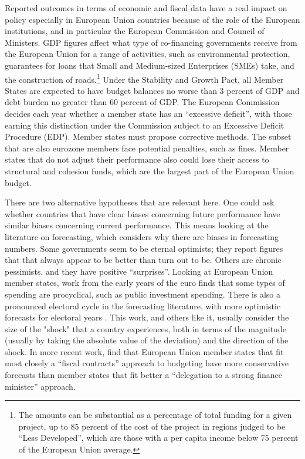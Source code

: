 \documentclass[]{article}
\begin{document}
Reported outcomes in terms of economic and fiscal data have a real impact on policy especially in European Union countries because of the role of the European institutions, and in particular the European Commission and Council of Ministers. GDP figures affect what type of co-financing governments receive from the European Union for a range of activities, such as environmental protection, guarantees for loans that Small and Medium-sized Enterprises (SMEs) take, and the construction of roads.\footnote{The amounts can be substantial as a percentage of total funding for a given project, up to 85 percent of the cost of the project in regions judged to be “Less Developed”, which are those with a per capita income below 75 percent of the European Union average.} Under the Stability and Growth Pact, all Member States are expected to have budget balances no worse than 3 percent of GDP and debt burden no greater than 60 percent of GDP. The European Commission decides each year whether a member state has an ``excessive deficit'', with those earning this distinction under the Commission subject to an Excessive Deficit Procedure (EDP). Member states must propose corrective methods. The subset that are also eurozone members face potential penalties, such as fines. Member states that do not adjust their performance also could lose their access to structural and cohesion funds, which are the largest part of the European Union budget.

There are two alternative hypotheses that are relevant here. One could ask whether countries that have clear biases concerning future performance have similar biases concerning current performance. This means looking at the literature on forecasting, which  considers why there are biases in forecasting numbers. Some governments seem to be eternal optimists; they report figures that that always appear to be better than turn out to be. Others are chronic pessimists, and they have positive ``surprises''. Looking at European Union member states, work from the early years of the euro finds that some types of spending are procyclical, such as public investment spending. There is also a pronounced electoral cycle in the forecasting literature, with more optimistic forecasts for electoral years \citep{hallerbergstrauch2002}. This work, and others like it, usually consider the size of the "shock" that a country experiences, both in terms of the magnitude (usually by taking the absolute value of the deviation) and the direction of the shock. In more recent work, \cite{hallerbergstrauch209} find that European Union member states that fit most closely a ``fiscal contracts'' approach to budgeting have more conservative forecasts than member states that fit better a ``delegation to a strong finance minister'' approach.
\end{document}
